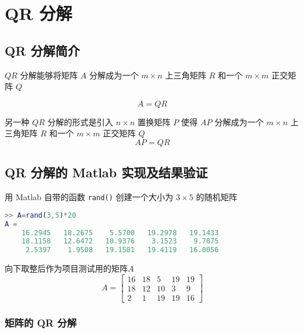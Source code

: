 \chapter{QR 分解}
\section{QR 分解简介}
$QR$ 分解能够将矩阵 $A$ 分解成为一个 $m\times n$ 上三角矩阵 $R$ 和一个 $m\times m$ 正交矩阵 $Q$

\begin{equation}
    A = QR
    \label{QR-decomposition}
\end{equation}

另一种 $QR$ 分解的形式是引入 $n\times n$ 置换矩阵 $P$ 使得 $AP$ 分解成为一个 $m\times n$ 上三角矩阵 $R$ 和一个 $m\times m$ 正交矩阵 $Q$
\begin{equation}
    AP = QR
    \label{QRP-decomposition}
\end{equation}

\section{QR 分解的 Matlab 实现及结果验证}
用 Matlab 自带的函数 \lstinline|rand()| 创建一个大小为 $3\times 5$ 的随机矩阵

\begin{lstlisting}[language=Matlab]  
>> A=rand(3,5)*20
A =
    16.2945   18.2675    5.5700   19.2978   19.1433
    18.1158   12.6472   10.9376    3.1523    9.7075
     2.5397    1.9508   19.1501   19.4119   16.0056
\end{lstlisting}


向下取整后作为项目测试用的矩阵$A$
\begin{equation}
    A=\begin{bmatrix}
        16&   18&    5&   19&   19\\
        18&   12&   10&    3&    9\\
        2&    1&   19&   19&   16
    \end{bmatrix}
\end{equation}




\subsection{矩阵的 QR 分解}



